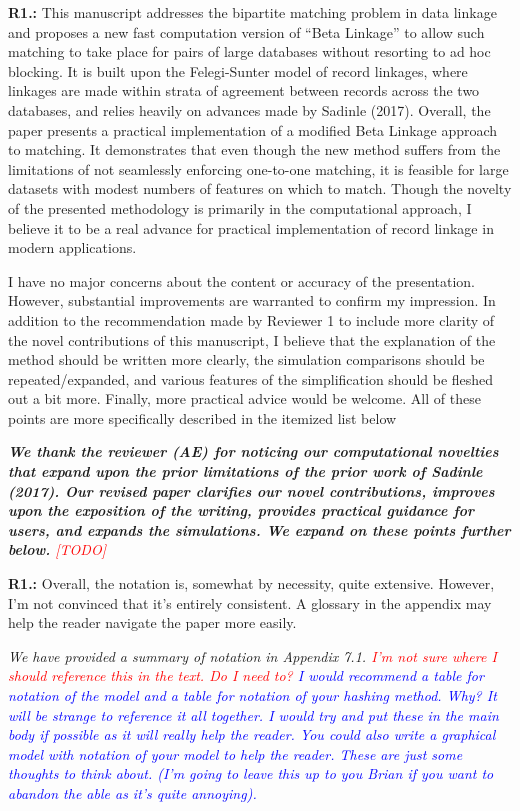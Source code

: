\documentclass[letterpaper, parskip]{scrartcl}
\newcommand{\pointRaised}[2]{%
	\textbf{#1.\theresponsectr:} #2
}
\newcounter{responsectr}[section]     %
\newcommand{\reply}[1]{%
	\refstepcounter{responsectr}%
		\begin{tcolorbox}
			\itshape #1
		\end{tcolorbox}
}
\newcommand{\todo}{\textcolor{red}{[TODO]}\xspace}
\begin{document}


	\setcounter{responsectr}{0}

	\pointRaised{R1}{%
	This manuscript addresses the bipartite matching problem in data linkage and proposes a new fast computation version of “Beta Linkage” to allow such matching to take place for pairs of large databases without resorting to ad hoc blocking. It is built upon the Felegi-Sunter model of record linkages, where linkages are made within strata of agreement between records across the two databases, and relies heavily on advances made by Sadinle (2017). Overall, the paper presents a practical implementation of a modified Beta Linkage approach to	matching. It demonstrates that even though the new method suffers from the limitations of not seamlessly enforcing one-to-one matching, it is feasible for large datasets with modest numbers of features on which to match. Though the novelty of the presented methodology is primarily in the computational approach, I believe it to be a real advance for practical implementation of record linkage in modern applications.
	
	I have no major concerns about the content or accuracy of the presentation. However, substantial improvements are warranted to confirm my impression. In addition to the recommendation made by Reviewer 1 to include more clarity of the novel contributions of this manuscript, I believe that the explanation of the method should be written more clearly, the simulation comparisons should be repeated/expanded, and various features of the simplification should be fleshed out a bit more. Finally, more practical advice would be welcome. All of these points are more specifically described in the itemized list below
	}

	\reply{%
	\textbf{We thank the reviewer (AE) for noticing our computational novelties that expand upon the prior limitations of the prior work of Sadinle (2017). Our revised paper clarifies our novel contributions, improves upon the exposition of the writing, provides practical guidance for users, and expands the simulations. We expand on these points further below.} \todo
	}


	\pointRaised{R1}{%
		Overall, the notation is, somewhat by necessity, quite extensive. However, I’m not convinced that it’s entirely consistent. A glossary in the appendix may help the reader navigate the paper more easily.}
\reply{%
	We have provided a summary of notation in Appendix 7.1. \textcolor{red}{I'm not sure where I should reference this in the text. Do I need to?}
	\textcolor{blue}{I would recommend a table for notation of the model and a table for notation of your hashing method. Why? It will be strange to reference it all together. I would try and put these in the main body if possible as it will really help the reader. You could also write a graphical model with notation of your model to help the reader. These are just some thoughts to think about. (I'm going to leave this up to you Brian if you want to abandon the able as it's quite annoying).}
}
\end{document}
